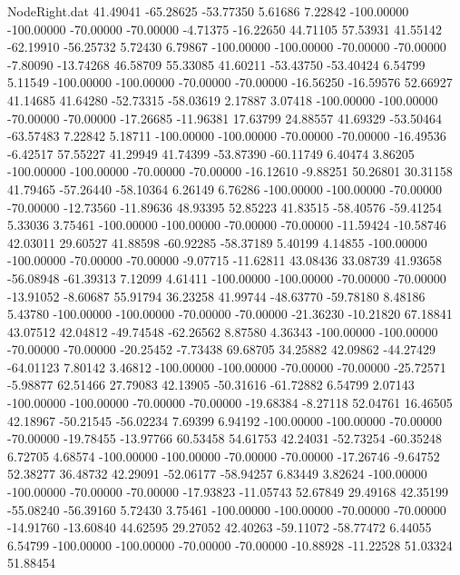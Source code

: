 \begin{filecontents}{NodeRight.dat}
  41.49041  -65.28625  -53.77350     5.61686    7.22842 -100.00000 -100.00000  -70.00000  -70.00000   -4.71375  -16.22650   44.71105   57.53931
  41.55142  -62.19910  -56.25732     5.72430    6.79867 -100.00000 -100.00000  -70.00000  -70.00000   -7.80090  -13.74268   46.58709   55.33085
  41.60211  -53.43750  -53.40424     6.54799    5.11549 -100.00000 -100.00000  -70.00000  -70.00000  -16.56250  -16.59576   52.66927   41.14685
  41.64280  -52.73315  -58.03619     2.17887    3.07418 -100.00000 -100.00000  -70.00000  -70.00000  -17.26685  -11.96381   17.63799   24.88557
  41.69329  -53.50464  -63.57483     7.22842    5.18711 -100.00000 -100.00000  -70.00000  -70.00000  -16.49536   -6.42517   57.55227   41.29949
  41.74399  -53.87390  -60.11749     6.40474    3.86205 -100.00000 -100.00000  -70.00000  -70.00000  -16.12610   -9.88251   50.26801   30.31158
  41.79465  -57.26440  -58.10364     6.26149    6.76286 -100.00000 -100.00000  -70.00000  -70.00000  -12.73560  -11.89636   48.93395   52.85223
  41.83515  -58.40576  -59.41254     5.33036    3.75461 -100.00000 -100.00000  -70.00000  -70.00000  -11.59424  -10.58746   42.03011   29.60527
  41.88598  -60.92285  -58.37189     5.40199    4.14855 -100.00000 -100.00000  -70.00000  -70.00000   -9.07715  -11.62811   43.08436   33.08739
  41.93658  -56.08948  -61.39313     7.12099    4.61411 -100.00000 -100.00000  -70.00000  -70.00000  -13.91052   -8.60687   55.91794   36.23258
  41.99744  -48.63770  -59.78180     8.48186    5.43780 -100.00000 -100.00000  -70.00000  -70.00000  -21.36230  -10.21820   67.18841   43.07512
  42.04812  -49.74548  -62.26562     8.87580    4.36343 -100.00000 -100.00000  -70.00000  -70.00000  -20.25452   -7.73438   69.68705   34.25882
  42.09862  -44.27429  -64.01123     7.80142    3.46812 -100.00000 -100.00000  -70.00000  -70.00000  -25.72571   -5.98877   62.51466   27.79083
  42.13905  -50.31616  -61.72882     6.54799    2.07143 -100.00000 -100.00000  -70.00000  -70.00000  -19.68384   -8.27118   52.04761   16.46505
  42.18967  -50.21545  -56.02234     7.69399    6.94192 -100.00000 -100.00000  -70.00000  -70.00000  -19.78455  -13.97766   60.53458   54.61753
  42.24031  -52.73254  -60.35248     6.72705    4.68574 -100.00000 -100.00000  -70.00000  -70.00000  -17.26746   -9.64752   52.38277   36.48732
  42.29091  -52.06177  -58.94257     6.83449    3.82624 -100.00000 -100.00000  -70.00000  -70.00000  -17.93823  -11.05743   52.67849   29.49168
  42.35199  -55.08240  -56.39160     5.72430    3.75461 -100.00000 -100.00000  -70.00000  -70.00000  -14.91760  -13.60840   44.62595   29.27052
  42.40263  -59.11072  -58.77472     6.44055    6.54799 -100.00000 -100.00000  -70.00000  -70.00000  -10.88928  -11.22528   51.03324   51.88454

\end{filecontents}
